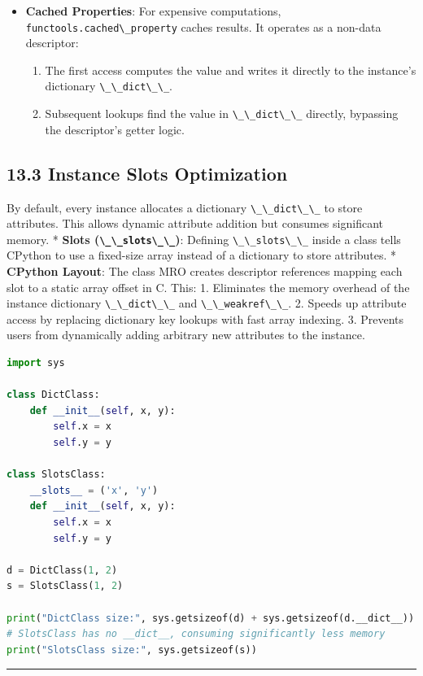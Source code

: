 \begin{itemize}
\tightlist
\item
  \textbf{Cached Properties}: For expensive computations,
  \passthrough{\lstinline!functools.cached\_property!} caches results.
  It operates as a non-data descriptor:

  \begin{enumerate}
  \def\labelenumi{\arabic{enumi}.}
  \tightlist
  \item
    The first access computes the value and writes it directly to the
    instance's dictionary \passthrough{\lstinline!\_\_dict\_\_!}.
  \item
    Subsequent lookups find the value in
    \passthrough{\lstinline!\_\_dict\_\_!} directly, bypassing the
    descriptor's getter logic.
  \end{enumerate}
\end{itemize}

\hypertarget{instance-slots-optimization}{%
\subsection{13.3 Instance Slots
Optimization}\label{instance-slots-optimization}}

By default, every instance allocates a dictionary
\passthrough{\lstinline!\_\_dict\_\_!} to store attributes. This allows
dynamic attribute addition but consumes significant memory. *
\textbf{Slots (\passthrough{\lstinline!\_\_slots\_\_!})}: Defining
\passthrough{\lstinline!\_\_slots\_\_!} inside a class tells CPython to
use a fixed-size array instead of a dictionary to store attributes. *
\textbf{CPython Layout}: The class MRO creates descriptor references
mapping each slot to a static array offset in C. This: 1. Eliminates the
memory overhead of the instance dictionary
\passthrough{\lstinline!\_\_dict\_\_!} and
\passthrough{\lstinline!\_\_weakref\_\_!}. 2. Speeds up attribute access
by replacing dictionary key lookups with fast array indexing. 3.
Prevents users from dynamically adding arbitrary new attributes to the
instance.

\begin{lstlisting}[language=Python]
import sys

class DictClass:
    def __init__(self, x, y):
        self.x = x
        self.y = y

class SlotsClass:
    __slots__ = ('x', 'y')
    def __init__(self, x, y):
        self.x = x
        self.y = y

d = DictClass(1, 2)
s = SlotsClass(1, 2)

print("DictClass size:", sys.getsizeof(d) + sys.getsizeof(d.__dict__))
# SlotsClass has no __dict__, consuming significantly less memory
print("SlotsClass size:", sys.getsizeof(s))
\end{lstlisting}

\begin{center}\rule{0.5\linewidth}{0.5pt}\end{center}

